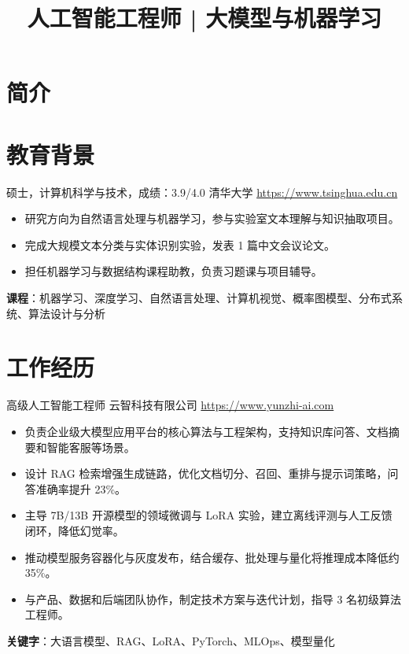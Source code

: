 \documentclass[a4paper, serif, 10pt]{moderncv}
\title{人工智能工程师 | 大模型与机器学习}
\begin{document}
\maketitle

\section{简介}

\section{教育背景}

        {硕士，计算机科学与技术，成绩：3.9/4.0}
        {清华大学}
        {\url{https://www.tsinghua.edu.cn}}
        {}
        {\begin{itemize}
\item 研究方向为自然语言处理与机器学习，参与实验室文本理解与知识抽取项目。
\item 完成大规模文本分类与实体识别实验，发表 1 篇中文会议论文。
\item 担任机器学习与数据结构课程助教，负责习题课与项目辅导。
\end{itemize}
\textbf{课程}：机器学习、深度学习、自然语言处理、计算机视觉、概率图模型、分布式系统、算法设计与分析}
\section{工作经历}

        {高级人工智能工程师}
        {云智科技有限公司}
        {\url{https://www.yunzhi-ai.com}}
        {}
        {\begin{itemize}
\item 负责企业级大模型应用平台的核心算法与工程架构，支持知识库问答、文档摘要和智能客服等场景。
\item 设计 RAG 检索增强生成链路，优化文档切分、召回、重排与提示词策略，问答准确率提升 23\%。
\item 主导 7B/13B 开源模型的领域微调与 LoRA 实验，建立离线评测与人工反馈闭环，降低幻觉率。
\item 推动模型服务容器化与灰度发布，结合缓存、批处理与量化将推理成本降低约 35\%。
\item 与产品、数据和后端团队协作，制定技术方案与迭代计划，指导 3 名初级算法工程师。
\end{itemize}
\textbf{关键字}：大语言模型、RAG、LoRA、PyTorch、MLOps、模型量化}
\end{document}
